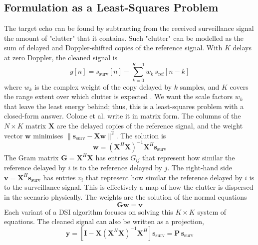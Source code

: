 \subsection{Formulation as a Least-Squares Problem}
\label{subsec:th.dsi.leastsquares}
\todo{}
The target echo can be found by subtracting from the received surveillance signal the amount of "clutter" that it contains. Such "clutter" can be modelled as the sum of delayed and Doppler-shifted copies of the reference signal. With $K$ delays at zero Doppler, the cleaned signal is
\begin{equation}
    y[n] = s_{\mathrm{surv}}[n] - \sum_{k=0}^{K-1} w_k \, s_{\mathrm{ref}}[n-k]
    \label{eq:dsi-filter}
\end{equation}
where $w_k$ is the complex weight of the copy delayed by $k$ samples, and $K$ covers the range extent over which clutter is expected \citep{colone2009}. We want the scale factors $w_k$ that leave the least energy behind; thus, this is a least-squares problem with a closed-form answer. Colone et al. \citep{colone2009} write it in matrix form. The columns of the $N \times K$ matrix $\mathbf{X}$ are the delayed copies of the reference signal, and the weight vector $\mathbf{w}$ minimises $\lVert \mathbf{s}_{\mathrm{surv}} - \mathbf{X}\mathbf{w} \rVert^2$. The solution is
\begin{equation}
    \mathbf{w} = (\mathbf{X}^H \mathbf{X})^{-1} \mathbf{X}^H \mathbf{s}_{\mathrm{surv}}
    \label{eq:dsi-ls}
\end{equation}
The Gram matrix $\mathbf{G} = \mathbf{X}^H \mathbf{X}$ has entries $G_{ij}$ that represent how similar the reference delayed by $i$ is to the reference delayed by $j$. The right-hand side $\mathbf{v} = \mathbf{X}^H \mathbf{s}_{\mathrm{surv}}$ has entries $v_i$ that represent how similar the reference delayed by $i$ is to the surveillance signal. This is effectively a map of how the clutter is dispersed in the scenario physically. The weights are the solution of the normal equations
\begin{equation}
    \mathbf{G} \mathbf{w} = \mathbf{v}
    \label{eq:dsi-normal}
\end{equation}
Each variant of a DSI algorithm focuses on solving this $K \times K$ system of equations. The cleaned signal can also be written as a projection,
\begin{equation}
    \mathbf{y} = \left[ \mathbf{I} - \mathbf{X} (\mathbf{X}^H \mathbf{X})^{-1} \mathbf{X}^H \right] \mathbf{s}_{\mathrm{surv}} = \mathbf{P} \, \mathbf{s}_{\mathrm{surv}}
    \label{eq:dsi-projection}
\end{equation}
